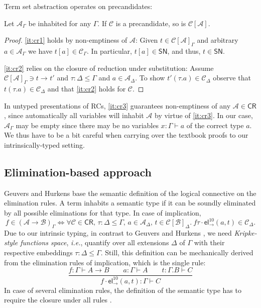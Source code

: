 \documentclass[a4paper,USenglish,cleveref, autoref, thm-restate]{lipics-v2019}
\newcommand{\ie}{\emph{i.e.}\xspace}
\newcommand{\ru}{\dfrac}
\newcommand{\tel}{\mathsf{el}}
\newcommand{\el}[2]{\ensuremath{\tel_{#1}^{#2}}}
\newcommand{\red}[1][]{\longrightarrow_{#1}}
\newcommand{\CR}{\mathsf{CR}}
\newcommand{\A}{\mathcal{A}}
\newcommand{\B}{\mathcal{B}}
\newcommand{\C}{\mathcal{C}}
\newcommand{\SN}{\mathsf{SN}}
\begin{document}
Term set abstraction operates on precandidates:
\begin{lemma}[Abstraction]
\label{lem:abs}
  Let $\A_\Gamma$ be inhabited for any $\Gamma$.
  If $\C$ is a precandidate, so is $\C[\A]$.
\end{lemma}
\begin{proof}
  \ref{it:cr1} holds by non-emptiness of $\A$:
  Given $t \in \C[\A]_\Gamma$ and
  arbitrary $a \in \A_\Gamma$ we have $t[a] \in \C_\Gamma$.  In
  particular, $t[a] \in \SN$, and thus, $t \in \SN$.

  \ref{it:cr2} relies on the closure of reduction
  under substitution:  Assume $\C[\A]_\Gamma \ni t \red t'$ and $\tau
  : \Delta \leq \Gamma$ and $a \in \A_\Delta$.  To show $t'(\tau.a)
  \in \C_\Delta$ observe that $t(\tau.a) \in \C_\Delta$ and that \ref{it:cr2}
  holds for $\C$.
\end{proof}

\begin{remark}
  In untyped presentations of RCs, \ref{it:cr3} guarantees
  non-emptiness of any $\A \in \CR$, since automatically all variables
  will inhabit $\A$ by virtue of \ref{it:cr3}.  In our case, $\A_\Gamma$
  may be empty since there may be no variables $x : \Gamma \vdash a$
  of the correct type $a$.  We thus have to be a bit careful when
  carrying over the textbook proofs
  \cite{girardLafontTaylor:proofsAndTypes}
  to our intrinsically-typed setting.
\end{remark}


\subsection{Elimination-based approach}
\label{sec:elimbased}

Geuvers and Hurkens \cite{geuversHurkens:types17} base the semantic
definition of the logical connective on the elimination rules.
A term inhabits a semantic type if it can be soundly eliminated by all
possible eliminations for that type.
In case of implication, %
\[
  f \in (\A \to \B)_\Gamma
  \iff
  \forall \C \in \CR, \,
  \tau : \Delta \leq \Gamma, \,
  a \in \A_\Delta, \,
  t \in \C[\B]_\Delta.\
  f\tau \cdot \el\to{10}(a,t) \in \C_\Delta .
\]
Due to our intrinsic typing,
in contrast to Geuvers and Hurkens \cite{geuversHurkens:types17},
we need \emph{Kripke-style functions space}, \ie,
quantify over all extensions $\Delta$ of $\Gamma$ with
their respective embeddings $\tau : \Delta \leq \Gamma$.
Still, this definition can be mechanically derived from the elimination rules
of implication, which is the single rule:
\[
  \ru{f : \Gamma \vdash A \to B \qquad
      a : \Gamma \vdash A \qquad
      t : \Gamma.B \vdash C
    }{f \cdot \el\to{10}(a,t) : \Gamma \vdash C
    }
\]
In case of several elimination rules, the definition of the semantic
type has to require the closure under all rules \cite{geuversHurkens:types17}.
\end{document}
